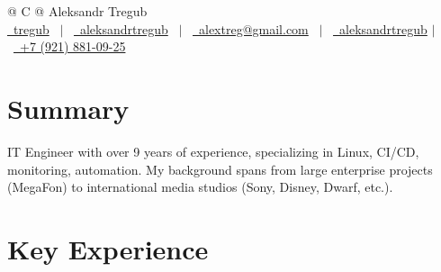 \documentclass[a4paper,12pt]{article}
\begin{document}
\pagestyle{empty} 



\begin{tabularx}{\linewidth}{@{} C @{}}
    \Huge{Aleksandr Tregub} \\[7.5pt]
    \href{https://github.com/tregub}{\raisebox{-0.05\height}\faGithub\ tregub} \ $|$ \ 
    \href{https://linkedin.com/in/aleksandrtregub}{\raisebox{-0.05\height}\faLinkedin\ aleksandrtregub} \ $|$ \ 
    \href{mailto:alextreg@gmail.com}{\raisebox{-0.05\height}\faEnvelope \ alextreg@gmail.com} \ $|$ \ 
    \href{https://t.me/aleksandrtregub}{\raisebox{-0.05\height}\faTelegram \ aleksandrtregub} $|$ \
    \href{tel:+79218810925}{\raisebox{-0.05\height}\faMobile \ +7 (921) 881-09-25} \\
\end{tabularx}


\section{Summary}
IT Engineer with over 9 years of experience, specializing in Linux, CI/CD, monitoring, automation. My background spans from large enterprise projects (MegaFon) to international media studios (Sony, Disney, Dwarf, etc.).

\section{Key Experience}
\end{document}
